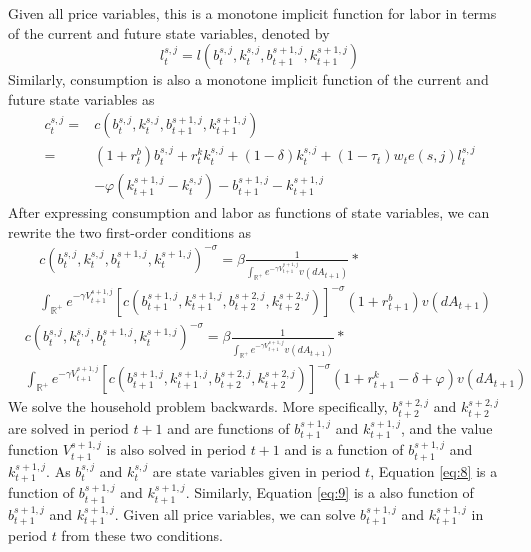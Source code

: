 \documentclass[12pt]{article}
\begin{document}
Given all price variables, this is a monotone implicit function for labor in terms of the current and future state variables, denoted by
\[ l_t^{s,j}=l(b_t^{s,j},k_t^{s,j},b_{t+1}^{s+1,j},k_{t+1}^{s+1,j}) \] 
Similarly, consumption is also a monotone implicit function of the current and future state variables as
\begin{equation}
\begin{split} 
c_t^{s,j}=&c(b_t^{s,j},k_t^{s,j},b_{t+1}^{s+1,j},k_{t+1}^{s+1,j})\\
=&(1+r_t^b)b_t^{s,j}+r_t^k k_t^{s,j}+(1-\delta)k_t^{s,j}+(1-\tau_t)w_te(s,j)l_t^{s,j}\\
&-\varphi(k_{t+1}^{s+1,j}-k_t^{s,j})- b_{t+1}^{s+1,j} - k_{t+1}^{s+1,j}
\end{split}
\end{equation}
After expressing consumption and labor as functions of state variables, we can rewrite the two first-order conditions as 
\begin{equation}
\begin{split}
&c(b_t^{s,j},k_t^{s,j},b_t^{s+1,j},k_t^{s+1,j})^{-\sigma} =\beta \frac{1}{\int_{\mathbb{R}^+} e^{{-\gamma}{V_{t+1}^{s+1,j}}}v(dA_{t+1})}*\\
&  \int_{\mathbb{R}^+} e^{{-\gamma}{V_{t+1}^{s+1,j}}}[c(b_{t+1}^{s+1,j},k_{t+1}^{s+1,j},b_{t+2}^{s+2,j},k_{t+2}^{s+2,j})]^{-\sigma}(1+r_{t+1}^b)v(dA_{t+1}) \label{eq:8}
\end{split}
\end{equation}
\begin{equation}
\begin{split}
&c(b_t^{s,j},k_t^{s,j},b_t^{s+1,j},k_t^{s+1,j})^{-\sigma} =\beta\frac{1}{\int_{\mathbb{R}^+} e^{{-\gamma}{V_{t+1}^{s+1,j}}}v(dA_{t+1})}*\\
& \int_{\mathbb{R}^+} e^{{-\gamma}{V_{t+1}^{s+1,j}}}[c(b_{t+1}^{s+1,j},k_{t+1}^{s+1,j},b_{t+2}^{s+2,j},k_{t+2}^{s+2,j})]^{-\sigma}(1+r^k_{t+1}-\delta+\varphi)v(dA_{t+1}) \label{eq:9}
\end{split}
\end{equation}
We solve the household problem backwards. More specifically, $b_{t+2}^{s+2,j}$ and $k_{t+2}^{s+2,j}$ are solved in period $t+1$ and are functions of $b_{t+1}^{s+1,j}$ and $k_{t+1}^{s+1,j}$, and the value function $V_{t+1}^{s+1,j}$ is also solved in period $t+1$ and is a function of $b_{t+1}^{s+1,j}$ and $k_{t+1}^{s+1,j}$. As $b_{t}^{s,j}$ and $k_{t}^{s,j}$ are state variables given in period $t$, Equation \eqref{eq:8} is a function of $b_{t+1}^{s+1,j}$ and $k_{t+1}^{s+1,j}$. Similarly, Equation \eqref{eq:9} is a also function of $b_{t+1}^{s+1,j}$ and $k_{t+1}^{s+1,j}$. Given all price variables, we can solve $b_{t+1}^{s+1,j}$ and $k_{t+1}^{s+1,j}$ in period $t$ from these two conditions. 
\end{document}
